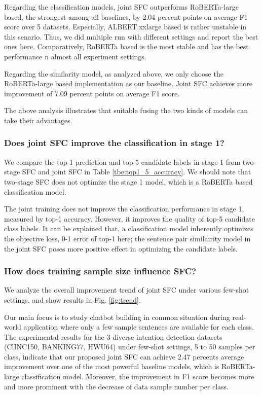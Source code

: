 Regarding the  classification  models,  joint SFC
outperforms RoBERTa-large based, the strongest among all baselines, 
by 2.04 percent points on average F1 score over 5 datasets.  
Especially, ALBERT.xxlarge based is rather unstable  in this senario. Thus, 
we did multiple run with different settings and  report the  best  ones here. 
Comparatively,  RoBERTa  based is  the  most stable and has the best performance 
n almost all experiment settings.

Regarding  the  similarity  model,  as  analyzed  above,  we  only  choose the
RoBERTa-large based implementation as our baseline. Joint SFC achieves more improvement of
7.09  percent points  on average F1 score. 

The above analysis illustrates that suitable fusing the two kinds of models
can take their advantages.

\subsubsection*{Does joint SFC improve the classification in stage 1?}
We  compare  the  top-1  prediction and top-5 candidate labels in stage 1 from
two-stage SFC and joint SFC in Table \ref{tbe:top1_5_accuracy}. We should note
that  two-stage  SFC  does not optimize the stage 1 model, which is a RoBERTa
based classification model.

The joint training does not improve the classification performance in stage 1,
measured  by  top-1  accuracy.  However,  it  improves  the  quality of top-5
candidate  class  labels.  It  can  be  explained that, a classification model
inherently optimizes the objective loss, 0-1 error of top-1 here; the sentence
pair similairity model in the joint SFC poses more positive effect in optimizing the 
candidate labels.


\subsubsection*{How does training sample size influence SFC?} 
We analyze the overall  improvement  trend  of  joint SFC under various few-shot
settings, and show results in Fig. \ref{fig:trend}.

Our main focus  is  to  study  chatbot  building  in common situation during real-world
application  where  only  a few sample sentences are available for each class.
The  experimental  results  for  the  3  diverse  intention detection datasets
(ClINC150,  BANKING77,  HWU64)  under  few-shot  settings, 5 to 50 samples per
class,  indicate that our proposed joint SFC can achieve 2.47 percents average
improvement   over  one  of  the  most  powerful  baseline  models,  which  is
RoBERTa-large  classification  model.  Moreover,  the  improvement  in F1 score
becomes  more  and  more prominent with the decrease of data sample number per
class.


